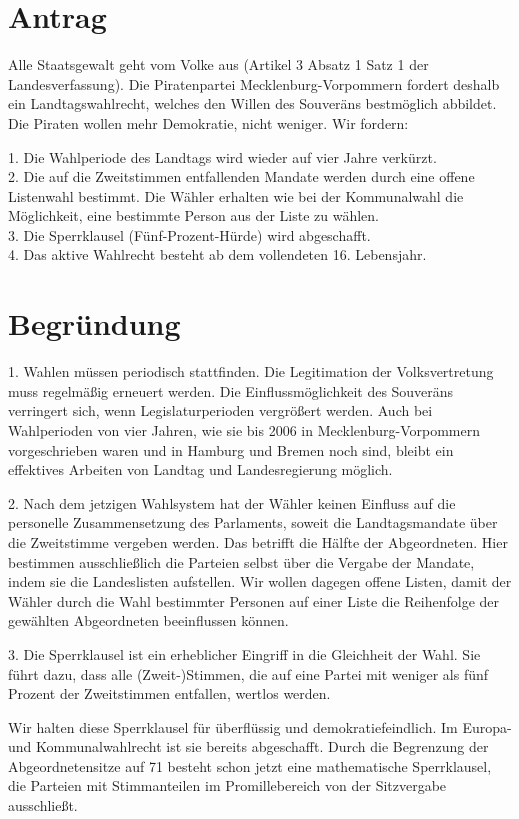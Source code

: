 \section{Antrag}

Alle Staatsgewalt geht vom Volke aus (Artikel 3 Absatz 1 Satz 1 der Landesverfassung). Die Piratenpartei Mecklenburg-Vorpommern fordert deshalb ein Landtagswahlrecht, welches den Willen des Souveräns bestmöglich abbildet. Die Piraten wollen mehr Demokratie, nicht weniger. Wir fordern:

1. Die Wahlperiode des Landtags wird wieder auf vier Jahre verkürzt.\\2. Die auf die Zweitstimmen entfallenden Mandate werden durch eine offene Listenwahl bestimmt. Die Wähler erhalten wie bei der Kommunalwahl die Möglichkeit, eine bestimmte Person aus der Liste zu wählen.\\3. Die Sperrklausel (Fünf-Prozent-Hürde) wird abgeschafft.\\4. Das aktive Wahlrecht besteht ab dem vollendeten 16. Lebensjahr.

\section{Begründung}

1. Wahlen müssen periodisch stattfinden. Die Legitimation der Volksvertretung muss regelmäßig erneuert werden. Die Einflussmöglichkeit des Souveräns verringert sich, wenn Legislaturperioden vergrößert werden. Auch bei Wahlperioden von vier Jahren, wie sie bis 2006 in Mecklenburg-Vorpommern vorgeschrieben waren und in Hamburg und Bremen noch sind, bleibt ein effektives Arbeiten von Landtag und Landesregierung möglich.

2. Nach dem jetzigen Wahlsystem hat der Wähler keinen Einfluss auf die personelle Zusammensetzung des Parlaments, soweit die Landtagsmandate über die Zweitstimme vergeben werden. Das betrifft die Hälfte der Abgeordneten. Hier bestimmen ausschließlich die Parteien selbst über die Vergabe der Mandate, indem sie die Landeslisten aufstellen. Wir wollen dagegen offene Listen, damit der Wähler durch die Wahl bestimmter Personen auf einer Liste die Reihenfolge der gewählten Abgeordneten beeinflussen können.

3. Die Sperrklausel ist ein erheblicher Eingriff in die Gleichheit der Wahl. Sie führt dazu, dass alle (Zweit-)Stimmen, die auf eine Partei mit weniger als fünf Prozent der Zweitstimmen entfallen, wertlos werden.

Wir halten diese Sperrklausel für überflüssig und demokratiefeindlich. Im Europa- und Kommunalwahlrecht ist sie bereits abgeschafft. Durch die Begrenzung der Abgeordnetensitze auf 71 besteht schon jetzt eine mathematische Sperrklausel, die Parteien mit Stimmanteilen im Promillebereich von der Sitzvergabe ausschließt.

